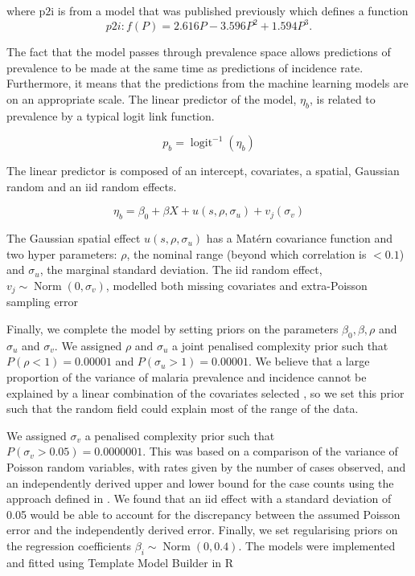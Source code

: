 \documentclass[11pt]{article}
\begin{document}
where $\mathrm{p2i}$ is from a model that was published previously \cite{cameron2015defining} which defines a function
$${p2i}: f\left(P\right) = 2.616P - 3.596P^2 + 1.594P^3.$$

The fact that the model passes through prevalence space allows predictions of prevalence to be made at the same time as predictions of incidence rate.
Furthermore, it means that the predictions from the machine learning models are on an appropriate scale.
The linear predictor of the model, $\eta_b$, is related to prevalence by a typical logit link function.

$$p_b = \operatorname{logit}^{-1}(\eta_b)$$

The linear predictor is composed of an intercept, covariates, a spatial, Gaussian random and an iid random effects.

$$\eta_b = \beta_0 + \beta X  + u(s, \rho, \sigma_u) + v_j(\sigma_v)$$

The Gaussian spatial effect $u(s, \rho, \sigma_u)$ has a Mat\'ern covariance function and two hyper parameters: $\rho$, the nominal range (beyond which correlation is $< 0.1$) and $\sigma_u$, the marginal standard deviation.
The iid random effect, $v_j \sim \operatorname{Norm}(0, \sigma_v)$, modelled both missing covariates and extra-Poisson sampling error

Finally, we complete the model by setting priors on the parameters $\beta_0, \beta, \rho$ and $\sigma_u$ and $\sigma_v$. We assigned $\rho$ and $\sigma_u$ a joint penalised complexity prior \cite{fuglstad2018constructing} such that $P(\rho < 1) = 0.00001$ and $P(\sigma_u > 1) = 0.00001$. 
We believe that a large proportion of the variance of malaria prevalence and incidence cannot be explained by a linear combination of the covariates selected \cite{bhatt2017improved}, so we set this prior such that the random field could explain most of the range of the data.

We assigned $\sigma_v$ a penalised complexity prior \cite{simpson2017penalising} such that $P(\sigma_v > 0.05) = 0.0000001$. This was based on a comparison of the variance of Poisson random variables, with rates given by the number of cases observed, and an independently derived upper and lower bound for the case counts using the approach defined in \cite{cibulskis2011worldwide}. We found that an iid effect with a standard deviation of 0.05 would be able to account for the discrepancy between the assumed Poisson error and the independently derived error.
Finally, we set regularising priors on the regression coefficients $\beta_i \sim \operatorname{ Norm}(0, 0.4)$. 
The models were implemented and fitted using Template Model Builder \cite{TMB} in R \cite{R}
\end{document}
